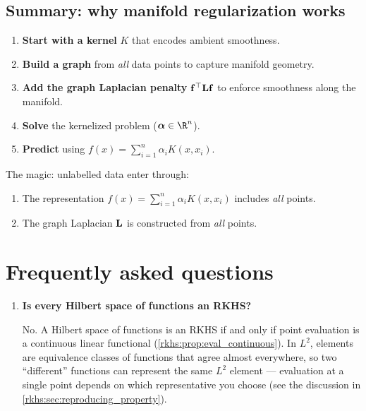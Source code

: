 \begin{notechapter}
\subsection{Summary: why manifold regularization works}
\label{rkhs:subsec:manifold_summary}

\begin{keyidea}
\begin{enumerate}
  \item \textbf{Start with a kernel} $K$ that encodes ambient smoothness.
  \item \textbf{Build a graph} from \emph{all} data points to capture
    manifold geometry.
  \item \textbf{Add the graph Laplacian penalty} $\mathbf{f}^\top \mathbf{L}
    \mathbf{f}$ to enforce smoothness along the manifold.
  \item \textbf{Solve} the kernelized problem ($\vect{\alpha} \in \R^n$).
  \item \textbf{Predict} using $f(x) = \sum_{i=1}^n \alpha_i K(x, x_i)$.
\end{enumerate}

The magic: unlabelled data enter through:
\begin{enumerate}[label=(\alph*)]
  \item The representation $f(x) = \sum_{i=1}^n \alpha_i K(x, x_i)$
    includes \emph{all} points.
  \item The graph Laplacian $\mathbf{L}$ is constructed from \emph{all}
    points.
\end{enumerate}
\end{keyidea}


\section{Frequently asked questions}
\label{rkhs:sec:faq}

\begin{enumerate}[label=\emph{Q\arabic*.}, leftmargin=*, itemsep=10pt]

\item \textbf{Is every Hilbert space of functions an RKHS?}

No. A Hilbert space of functions is an RKHS if and only
if point evaluation is a continuous linear functional
(\cref{rkhs:prop:eval_continuous}). In $L^2$,
elements are equivalence classes of functions that
agree almost everywhere, so two ``different'' functions
can represent the same $L^2$ element --- evaluation at
a single point depends on which representative you
choose (see the discussion in
\cref{rkhs:sec:reproducing_property}).


\end{enumerate}
\end{notechapter}
